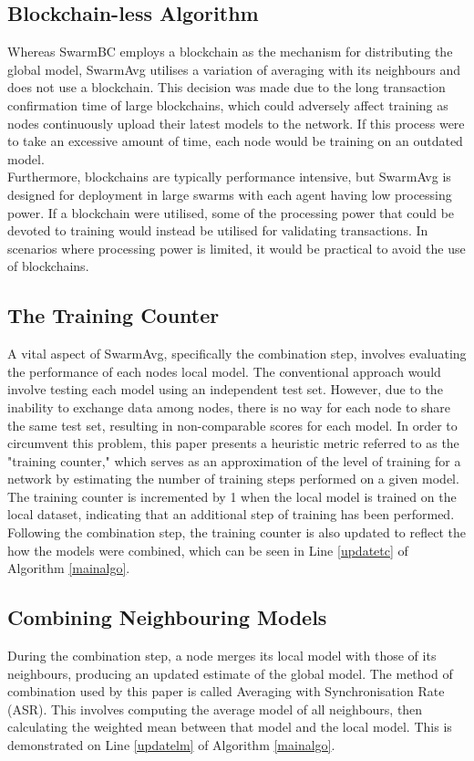 \documentclass[letterpaper, 10 pt, conference]{ieeeconf}  %
\begin{document}
\subsection{Blockchain-less Algorithm}
Whereas SwarmBC employs a blockchain as the mechanism for distributing the global model, SwarmAvg utilises a variation of averaging with its neighbours and does not use a blockchain. This decision was made due to the long transaction confirmation time of large blockchains, which could adversely affect training as nodes continuously upload their latest models to the network. If this process were to take an excessive amount of time, each node would be training on an outdated model. \\

Furthermore, blockchains are typically performance intensive, but SwarmAvg is designed for deployment in large swarms with each agent having low processing power. If a blockchain were utilised, some of the processing power that could be devoted to training would instead be utilised for validating transactions. In scenarios where processing power is limited, it would be practical to avoid the use of blockchains.

\subsection{The Training Counter}
A vital aspect of SwarmAvg, specifically the combination step, involves evaluating the performance of each nodes local model. The conventional approach would involve testing each model using an independent test set. However, due to the inability to exchange data among nodes, there is no way for each node to share the same test set, resulting in non-comparable scores for each model. In order to circumvent this problem, this paper presents a heuristic metric referred to as the "training counter," which serves as an approximation of the level of training for a network by estimating the number of training steps performed on a given model. \\

The training counter is incremented by 1 when the local model is trained on the local dataset, indicating that an additional step of training has been performed. Following the combination step, the training counter is also updated to reflect the how the models were combined, which can be seen in Line \ref{updatetc} of Algorithm \ref{mainalgo}.

\subsection{Combining Neighbouring Models} \label{mcm}
During the combination step, a node merges its local model with those of its neighbours, producing an updated estimate of the global model. The method of combination used by this paper is called Averaging with Synchronisation Rate (ASR). This involves computing the average model of all neighbours, then calculating the weighted mean between that model and the local model. This is demonstrated on Line \ref{updatelm} of Algorithm \ref{mainalgo}.
\end{document}
